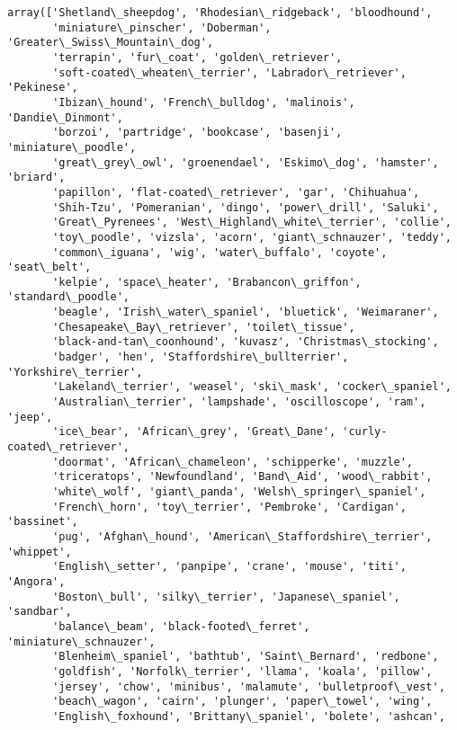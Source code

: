 \documentclass[11pt]{article}
\makeatletter
\newcommand{\boxspacing}{\kern\kvtcb@left@rule\kern\kvtcb@boxsep}
\newcommand{\prompt}[4]{
        {\ttfamily\llap{{\color{#2}[#3]:\hspace{3pt}#4}}\vspace{-\baselineskip}}
    }
\makeatother
\begin{document}
            \begin{tcolorbox}[breakable, size=fbox, boxrule=.5pt, pad at break*=1mm, opacityfill=0]
\prompt{Out}{outcolor}{27}{\boxspacing}
\begin{Verbatim}[commandchars=\\\{\}]
array(['Shetland\_sheepdog', 'Rhodesian\_ridgeback', 'bloodhound',
       'miniature\_pinscher', 'Doberman', 'Greater\_Swiss\_Mountain\_dog',
       'terrapin', 'fur\_coat', 'golden\_retriever',
       'soft-coated\_wheaten\_terrier', 'Labrador\_retriever', 'Pekinese',
       'Ibizan\_hound', 'French\_bulldog', 'malinois', 'Dandie\_Dinmont',
       'borzoi', 'partridge', 'bookcase', 'basenji', 'miniature\_poodle',
       'great\_grey\_owl', 'groenendael', 'Eskimo\_dog', 'hamster', 'briard',
       'papillon', 'flat-coated\_retriever', 'gar', 'Chihuahua',
       'Shih-Tzu', 'Pomeranian', 'dingo', 'power\_drill', 'Saluki',
       'Great\_Pyrenees', 'West\_Highland\_white\_terrier', 'collie',
       'toy\_poodle', 'vizsla', 'acorn', 'giant\_schnauzer', 'teddy',
       'common\_iguana', 'wig', 'water\_buffalo', 'coyote', 'seat\_belt',
       'kelpie', 'space\_heater', 'Brabancon\_griffon', 'standard\_poodle',
       'beagle', 'Irish\_water\_spaniel', 'bluetick', 'Weimaraner',
       'Chesapeake\_Bay\_retriever', 'toilet\_tissue',
       'black-and-tan\_coonhound', 'kuvasz', 'Christmas\_stocking',
       'badger', 'hen', 'Staffordshire\_bullterrier', 'Yorkshire\_terrier',
       'Lakeland\_terrier', 'weasel', 'ski\_mask', 'cocker\_spaniel',
       'Australian\_terrier', 'lampshade', 'oscilloscope', 'ram', 'jeep',
       'ice\_bear', 'African\_grey', 'Great\_Dane', 'curly-coated\_retriever',
       'doormat', 'African\_chameleon', 'schipperke', 'muzzle',
       'triceratops', 'Newfoundland', 'Band\_Aid', 'wood\_rabbit',
       'white\_wolf', 'giant\_panda', 'Welsh\_springer\_spaniel',
       'French\_horn', 'toy\_terrier', 'Pembroke', 'Cardigan', 'bassinet',
       'pug', 'Afghan\_hound', 'American\_Staffordshire\_terrier', 'whippet',
       'English\_setter', 'panpipe', 'crane', 'mouse', 'titi', 'Angora',
       'Boston\_bull', 'silky\_terrier', 'Japanese\_spaniel', 'sandbar',
       'balance\_beam', 'black-footed\_ferret', 'miniature\_schnauzer',
       'Blenheim\_spaniel', 'bathtub', 'Saint\_Bernard', 'redbone',
       'goldfish', 'Norfolk\_terrier', 'llama', 'koala', 'pillow',
       'jersey', 'chow', 'minibus', 'malamute', 'bulletproof\_vest',
       'beach\_wagon', 'cairn', 'plunger', 'paper\_towel', 'wing',
       'English\_foxhound', 'Brittany\_spaniel', 'bolete', 'ashcan',

\end{Verbatim}
\end{tcolorbox}
\end{document}
